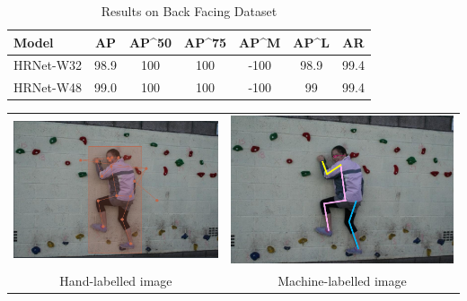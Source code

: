 \documentclass[a4paper,12pt]{article}
\begin{document}
    \begin{table}[h]
    \begin{center}
    \begin{tabular}{ l | c | c | c | c | c | c}
    Model & AP & AP^{50} & AP^{75} & AP^{M} & AP^{L} & AR \\
    \hline \hline
    HRNet-W32 & 98.9 & 100 & 100 & -100 & 98.9 & 99.4 \\
    HRNet-W48 & 99.0 & 100 & 100 & -100 & 99 & 99.4 \\
    \end{tabular}
    \caption{Results on Back Facing Dataset}
    \label{tab:caption}
    \end{center}
    \end{table}
    \begin{center}
\begin{tabular}{cc}
\includegraphics[scale=0.265]{back_label.PNG}
&
\includegraphics[scale=0.25]{back_pred.png}
\\
Hand-labelled image & Machine-labelled image
\end{tabular}
\end{center}
\end{document}

